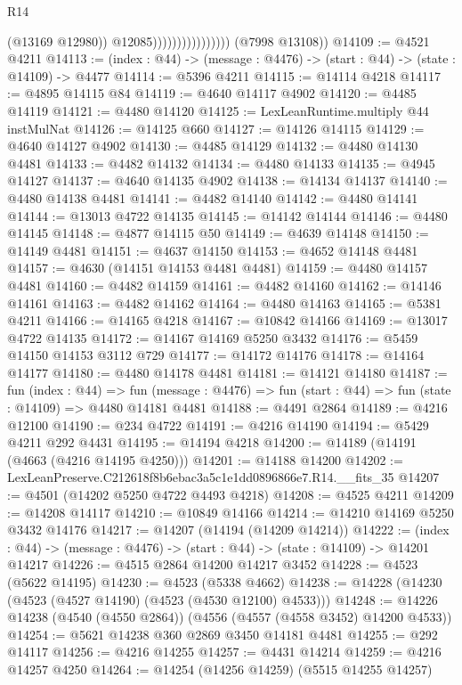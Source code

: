 \begin{lexlean}{R14}
\begin{coremodule}
                                        (@13169 @12980))
                                      @12085))))))))))))))))
      (@7998 @13108))
@14109 := @4521 @4211
@14113 := (index : @44) -> (message : @4476) -> (start : @44) -> (state : @14109) -> @4477
@14114 := @5396 @4211
@14115 := @14114 @4218
@14117 := @4895 @14115 @84
@14119 := @4640 @14117 @4902
@14120 := @4485 @14119
@14121 := @4480 @14120
@14125 := LexLeanRuntime.multiply @44 instMulNat
@14126 := @14125 @660
@14127 := @14126 @14115
@14129 := @4640 @14127 @4902
@14130 := @4485 @14129
@14132 := @4480 @14130 @4481
@14133 := @4482 @14132
@14134 := @4480 @14133
@14135 := @4945 @14127
@14137 := @4640 @14135 @4902
@14138 := @14134 @14137
@14140 := @4480 @14138 @4481
@14141 := @4482 @14140
@14142 := @4480 @14141
@14144 := @13013 @4722 @14135
@14145 := @14142 @14144
@14146 := @4480 @14145
@14148 := @4877 @14115 @50
@14149 := @4639 @14148
@14150 := @14149 @4481
@14151 := @4637 @14150
@14153 := @4652 @14148 @4481
@14157 := @4630 (@14151 @14153 @4481 @4481)
@14159 := @4480 @14157 @4481
@14160 := @4482 @14159
@14161 := @4482 @14160
@14162 := @14146 @14161
@14163 := @4482 @14162
@14164 := @4480 @14163
@14165 := @5381 @4211
@14166 := @14165 @4218
@14167 := @10842 @14166
@14169 := @13017 @4722 @14135
@14172 := @14167 @14169 @5250 @3432
@14176 := @5459 @14150 @14153 @3112 @729
@14177 := @14172 @14176
@14178 := @14164 @14177
@14180 := @4480 @14178 @4481
@14181 := @14121 @14180
@14187 := fun (index : @44) =>
  fun (message : @4476) => fun (start : @44) => fun (state : @14109) => @4480 @14181 @4481
@14188 := @4491 @2864
@14189 := @4216 @12100
@14190 := @234 @4722
@14191 := @4216 @14190
@14194 := @5429 @4211 @292 @4431
@14195 := @14194 @4218
@14200 := @14189 (@14191 (@4663 (@4216 @14195 @4250)))
@14201 := @14188 @14200
@14202 := LexLeanPreserve.C212618f8b6ebac3a5c1e1dd0896866e7.R14.__fits_35
@14207 := @4501 (@14202 @5250 @4722 @4493 @4218)
@14208 := @4525 @4211
@14209 := @14208 @14117
@14210 := @10849 @14166
@14214 := @14210 @14169 @5250 @3432 @14176
@14217 := @14207 (@14194 (@14209 @14214))
@14222 := (index : @44) -> (message : @4476) -> (start : @44) -> (state : @14109) -> @14201 @14217
@14226 := @4515 @2864 @14200 @14217 @3452
@14228 := @4523 (@5622 @14195)
@14230 := @4523 (@5338 @4662)
@14238 := @14228 (@14230 (@4523 (@4527 @14190) (@4523 (@4530 @12100) @4533)))
@14248 := @14226 @14238 (@4540 (@4550 @2864)) (@4556 (@4557 (@4558 @3452) @14200 @4533))
@14254 := @5621 @14238 @360 @2869 @3450 @14181 @4481
@14255 := @292 @14117
@14256 := @4216 @14255
@14257 := @4431 @14214
@14259 := @4216 @14257 @4250
@14264 := @14254 (@14256 @14259) (@5515 @14255 @14257)

\end{coremodule}
\end{lexlean}
